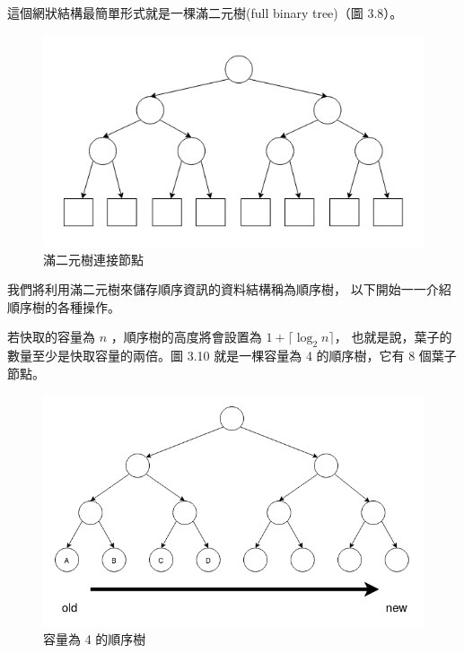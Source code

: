 這個網狀結構最簡單形式就是一棵滿二元樹(full binary tree)（圖 3.8）。

\begin{figure}[h!]
\includegraphics[width=\textwidth]{滿二元樹}
\caption{滿二元樹連接節點}
\end{figure}

我們將利用滿二元樹來儲存順序資訊的資料結構稱為順序樹，
以下開始一一介紹順序樹的各種操作。

若快取的容量為 $n$ ，順序樹的高度將會設置為 $1 + \lceil \log_2 n \rceil$，
也就是說，葉子的數量至少是快取容量的兩倍。圖 3.10 就是一棵容量為 4 的順序樹，它有 8 個葉子節點。

\begin{figure}[h!]
\includegraphics[width=\textwidth]{順序樹}
\caption{容量為 4 的順序樹}
\end{figure}